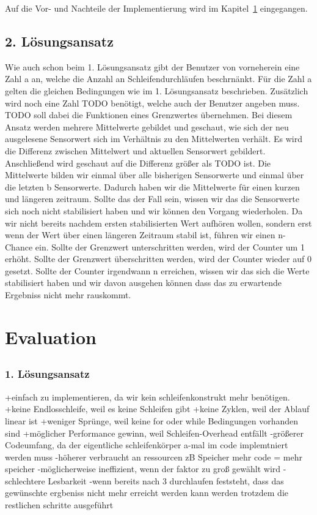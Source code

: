 \documentclass{article}
\begin{document}
    Auf die Vor- und Nachteile der Implementierung wird im Kapitel~\ref{Evaluation} eingegangen.
    \subsection{2. Lösungsansatz}
    Wie auch schon beim 1. Lösungsansatz gibt der Benutzer von vorneherein eine Zahl a an, welche die Anzahl an Schleifendurchläufen beschrnänkt. Für die Zahl a gelten die gleichen Bedingungen wie im 1. Lösungsansatz beschrieben. 
    Zusätzlich wird noch eine Zahl TODO benötigt, welche auch der Benutzer angeben muss. TODO soll dabei die Funktionen eines Grenzwertes übernehmen.
    Bei diesem Ansatz werden mehrere Mittelwerte gebildet und geschaut, wie sich der neu ausgelesene Sensorwert sich im Verhältnis zu den Mittelwerten verhält. Es wird die Differenz zwischen Mittelwert und aktuellen Sensorwert gebildert. Anschließend wird geschaut auf die Differenz größer als TODO ist.
    Die Mittelwerte bilden wir einmal über alle bisherigen Sensorwerte und einmal über die letzten b Sensorwerte. Dadurch haben wir die Mittelwerte für einen kurzen und längeren zeitraum.
    Sollte das der Fall sein, wissen wir das die Sensorwerte sich noch nicht stabilisiert haben und wir können den Vorgang wiederholen. Da wir nicht bereits nachdem ersten stabilisierten Wert aufhören wollen, sondern erst wenn der Wert über einen längeren Zeitraum stabil ist, führen wir einen n-Chance ein.
    Sollte der Grenzwert unterschritten werden, wird der Counter um 1 erhöht. Sollte der Grenzwert überschritten werden, wird der Counter wieder auf 0 gesetzt. Sollte der Counter irgendwann n erreichen, wissen wir das sich die Werte stabilisiert haben und wir davon ausgehen können dass das zu erwartende Ergebniss nicht mehr rauskommt.
    \newpage
    \section{Evaluation}
    \label{Evaluation}
    \subsection{}
    \subsubsection{1. Lösungsansatz}
    +einfach zu implementieren, da wir kein schleifenkonstrukt mehr benötigen.
    +keine Endlosschleife, weil es keine Schleifen gibt
    +keine Zyklen, weil der Ablauf linear ist
    +weniger Sprünge, weil keine for oder while Bedingungen vorhanden sind
    +möglicher Performance gewinn, weil Schleifen-Overhead entfällt
    -größerer Codeumfang, da der eigentliche schleifenkörper a-mal im code implemtniert werden muss 
    -höherer verbraucht an ressourcen zB Speicher mehr code = mehr speicher
    -möglicherweise ineffizient, wenn der faktor zu groß gewählt wird
    -schlechtere Lesbarkeit
    -wenn bereits nach 3 durchlaufen feststeht, dass das gewünschte ergbeniss nicht mehr erreicht werden kann werden trotzdem die restlichen schritte ausgeführt
\end{document}
